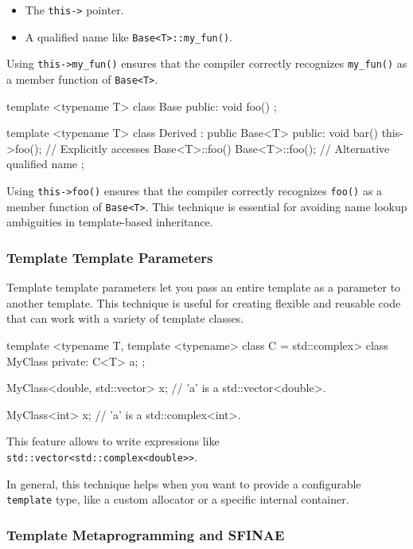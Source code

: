 \begin{itemize}
    \item The \texttt{this->} pointer.
    \item A qualified name like \texttt{Base<T>::my\_fun()}.
\end{itemize}

Using \texttt{this->my\_fun()} ensures that the compiler correctly recognizes \texttt{my\_fun()} as a member function of \texttt{Base<T>}.

\begin{codeblock}[language=C++, numbers=none]
template <typename T>
class Base {
public:
    void foo() {}
};

template <typename T>
class Derived : public Base<T> {
public:
    void bar() {
        this->foo();       // Explicitly accesses Base<T>::foo()
        Base<T>::foo();    // Alternative qualified name
    }
};
\end{codeblock}

Using \texttt{this->foo()} ensures that the compiler correctly recognizes \texttt{foo()} as a member function of \texttt{Base<T>}. This technique is essential for avoiding name lookup ambiguities in template-based inheritance.


\subsubsection{Template Template Parameters}

Template template parameters let you pass an entire template as a parameter to another template. This technique is useful for creating flexible and reusable code that can work with a variety of template classes.

\begin{codeblock}[language=C++]
template <typename T, template <typename> class C = std::complex>
class MyClass {
private:
    C<T> a;
};

MyClass<double, std::vector> x; // 'a' is a std::vector<double>.

MyClass<int> x; // 'a' is a std::complex<int>.
\end{codeblock}

This feature allows to write expressions like \texttt{std::vector<std::complex<double>>}.

In general, this technique helps when you want to provide a configurable \texttt{template} type, like a custom allocator or a specific internal container.

\subsubsection{Template Metaprogramming and SFINAE}

